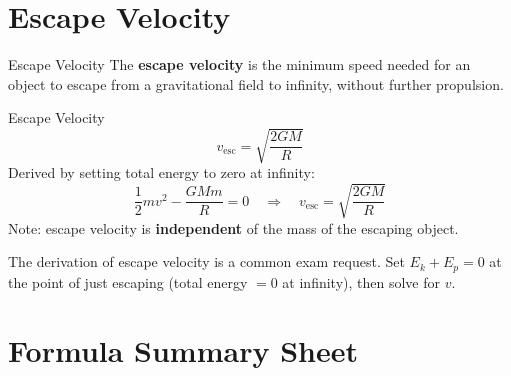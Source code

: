 \section{Escape Velocity}

\begin{defnbox}{Escape Velocity}
The \textbf{escape velocity} is the minimum speed needed for an object to escape from
a gravitational field to infinity, without further propulsion.
\end{defnbox}

\begin{formulabox}{Escape Velocity}
\begin{equation}
  v_{\text{esc}} = \sqrt{\frac{2GM}{R}}
\end{equation}
Derived by setting total energy to zero at infinity:
\[
  \frac{1}{2}mv^2 - \frac{GMm}{R} = 0
  \quad\Longrightarrow\quad
  v_{\text{esc}} = \sqrt{\frac{2GM}{R}}
\]
Note: escape velocity is \textbf{independent} of the mass of the escaping object.
\end{formulabox}

\begin{tipbox}
The derivation of escape velocity is a common exam request. Set $E_k + E_p = 0$
at the point of just escaping (total energy $= 0$ at infinity), then solve for $v$.
\end{tipbox}

\section{Formula Summary Sheet}

